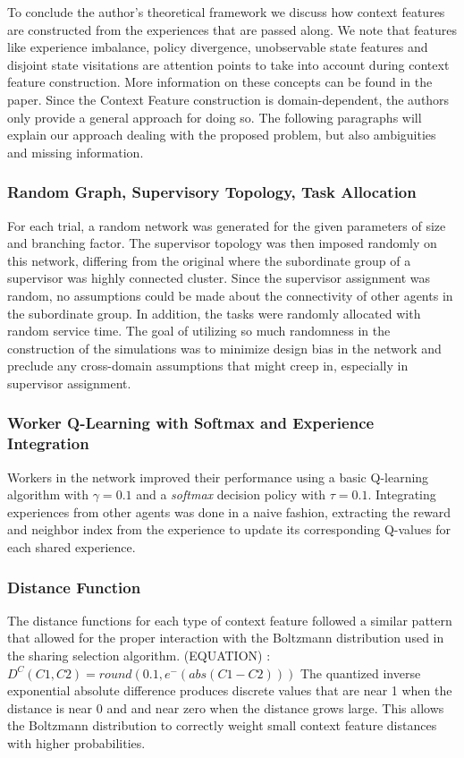 \documentclass[letterpaper]{article}
\begin{document}
To conclude the author’s theoretical framework we discuss how context features are constructed from the experiences that are passed along. We note that features like experience imbalance, policy divergence, unobservable state features and disjoint state visitations are attention points to take into account during context feature construction. More information on these concepts can be found in the paper. Since the Context Feature construction is domain-dependent, the authors only provide a general approach for doing so. The following paragraphs will explain our approach dealing with the proposed problem, but also ambiguities and missing information.

\subsubsection{Random Graph, Supervisory Topology, Task Allocation}
For each trial, a random network was generated for the given parameters of size and branching factor.  The supervisor topology was then imposed randomly on this network, differing from the original where the subordinate group of a supervisor was highly connected cluster.  Since the supervisor assignment was random, no assumptions could be made about the connectivity of other agents in the subordinate group.  In addition, the tasks were randomly allocated with random service time.  The goal of utilizing so much randomness in the construction of the simulations was to minimize design bias in the network and preclude any cross-domain assumptions that might creep in, especially in supervisor assignment.

\subsubsection{Worker Q-Learning with Softmax and Experience Integration}
Workers in the network improved their performance using a basic Q-learning algorithm with $\gamma = 0.1$ and a \textit{softmax} decision policy with $\tau = 0.1$.  Integrating experiences from other agents was done in a naive fashion, extracting the reward and neighbor index from the experience to update its corresponding Q-values for each shared experience.

\subsubsection{Distance Function}
The distance functions for each type of context feature followed a similar pattern that allowed for the proper interaction with the Boltzmann distribution used in the sharing selection algorithm.
(EQUATION)  :  $D^C(C1, C2) = round(0.1, e^-(abs(C1 - C2)))$
The quantized inverse exponential absolute difference produces discrete values that are near 1 when the distance is near 0 and and near zero when the distance grows large.  This allows the Boltzmann distribution to correctly weight small context feature distances with higher probabilities.
\end{document}
